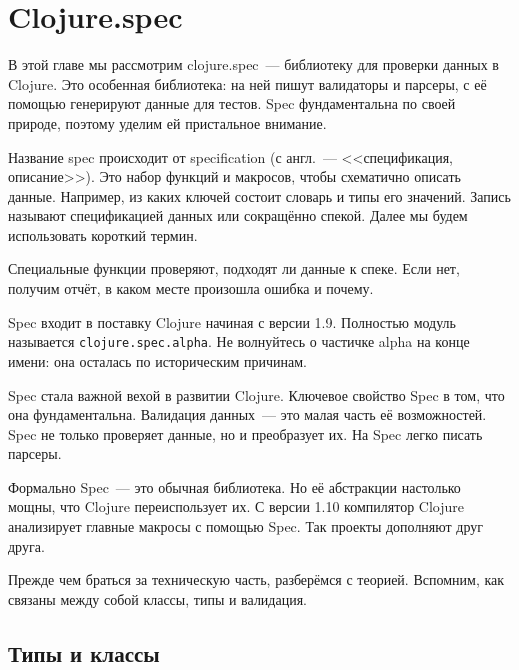 \chapter{Clojure.spec}

\label{chapter-spec}


\begin{teaser}
В этой главе мы рассмотрим clojure.spec~--- библиотеку для проверки данных в
Clojure. Это особенная библиотека: на ней пишут валидаторы и парсеры, с её
помощью генерируют данные для тестов. Spec фундаментальна по своей природе,
поэтому уделим ей пристальное внимание.
\end{teaser}

Название spec происходит от specification (с англ.~--- <<спецификация, описание>>). Это
набор функций и макросов, чтобы схематично описать данные. Например, из каких
ключей состоит словарь и типы его значений. Запись называют спецификацией данных или
сокращённо спекой. Далее мы будем использовать короткий термин.

Специальные функции проверяют, подходят ли данные к спеке. Если нет, получим
отчёт, в каком месте произошла ошибка и почему.


Spec входит в поставку Clojure начиная с версии 1.9. Полностью модуль называется
\verb|clojure.spec.alpha|. Не волнуйтесь о частичке alpha на конце
имени: она осталась по историческим причинам.


Spec стала важной вехой в развитии Clojure. Ключевое свойство Spec в том, что
она фундаментальна. Валидация данных~--- это малая часть её возможностей. Spec
не только проверяет данные, но и преобразует их. На Spec легко писать парсеры.

Формально Spec~--- это обычная библиотека. Но её абстракции настолько мощны, что
Clojure переиспользует их. С версии 1.10 компилятор Clojure анализирует главные
макросы с помощью Spec. Так проекты дополняют друг друга.

Прежде чем браться за техническую часть, разберёмся с теорией. Вспомним, как
связаны между собой классы, типы и валидация.

\section{Типы и классы}

\label{type-and-pred}

